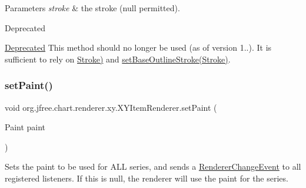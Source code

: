 \begin{DoxyParams}{Parameters}
{\em stroke} & the stroke ({\ttfamily null} permitted).\\
\hline
\end{DoxyParams}
\begin{DoxyRefDesc}{Deprecated}
\item[\mbox{\hyperlink{deprecated__deprecated000222}{Deprecated}}]This method should no longer be used (as of version 1..). It is sufficient to rely on \mbox{\hyperlink{}{Stroke)}} and \mbox{\hyperlink{interfaceorg_1_1jfree_1_1chart_1_1renderer_1_1xy_1_1_x_y_item_renderer_aab77837ee355fecff3b20d5559727bf3}{set\+Base\+Outline\+Stroke(\+Stroke)}}. \end{DoxyRefDesc}
\mbox{\label{interfaceorg_1_1jfree_1_1chart_1_1renderer_1_1xy_1_1_x_y_item_renderer_aa9b5df17f4ddc8fa6f034e8facbbfac3}} 
\subsubsection{\texorpdfstring{set\+Paint()}{setPaint()}}
{\footnotesize\ttfamily void org.\+jfree.\+chart.\+renderer.\+xy.\+X\+Y\+Item\+Renderer.\+set\+Paint (\begin{DoxyParamCaption}\item[{Paint}]{paint }\end{DoxyParamCaption})}

Sets the paint to be used for A\+LL series, and sends a \mbox{\hyperlink{}{Renderer\+Change\+Event}} to all registered listeners. If this is {\ttfamily null}, the renderer will use the paint for the series.


